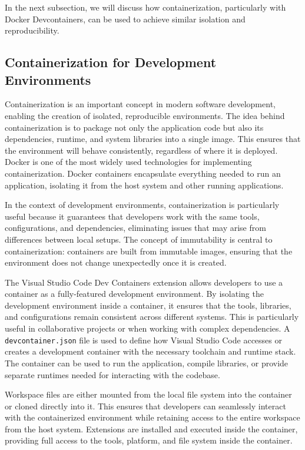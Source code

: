 In the next subsection, we will discuss how containerization, particularly with
Docker Devcontainers, can be used to achieve similar isolation and reproducibility.

\subsection{Containerization for Development Environments}

Containerization is an important concept in modern software development, enabling
the creation of isolated, reproducible environments. The idea behind containerization
is to package not only the application code but also its dependencies, runtime, and
system libraries into a single image. This ensures that the environment will behave
consistently, regardless of where it is deployed. Docker is one of the most widely
used technologies for implementing containerization. Docker containers encapsulate
everything needed to run an application, isolating it from the host system and other
running applications.

In the context of development environments, containerization is particularly useful
because it guarantees that developers work with the same tools, configurations, and
dependencies, eliminating issues that may arise from differences between local setups.
The concept of immutability is central to containerization: containers are built from
immutable images, ensuring that the environment does not change unexpectedly once it
is created.

The Visual Studio Code Dev Containers extension allows developers to use a container
as a fully-featured development environment. By isolating the development environment
inside a container, it ensures that the tools, libraries, and configurations remain
consistent across different systems. This is particularly useful in collaborative
projects or when working with complex dependencies. A \texttt{devcontainer.json}
file is used to define how Visual Studio Code accesses or creates a development
container with the necessary toolchain and runtime stack. The container can be used
to run the application, compile libraries, or provide separate runtimes needed
for interacting with the codebase.

Workspace files are either mounted from the local file system into the container
or cloned directly into it. This ensures that developers can seamlessly interact
with the containerized environment while retaining access to the entire workspace
from the host system. Extensions are installed and executed inside the container,
providing full access to the tools, platform, and file system inside the container.

